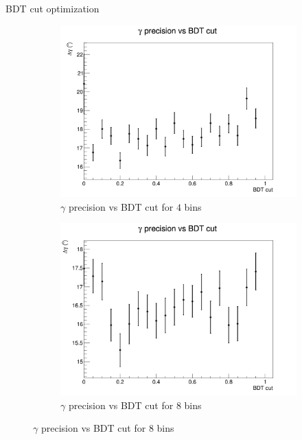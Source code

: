\documentclass{beamer}
\begin{document}
\begin{frame}{BDT cut optimization}
  \begin{figure}
    \centering
    \vspace{-0.2cm}
    \begin{subfigure}{0.5\textwidth}
      \includegraphics[width = 1.0\textwidth]{BDTOptimization_4Bins_Run2.png}
      \caption{$\gamma$ precision vs BDT cut for $4$ bins}
    \end{subfigure}%
    \begin{subfigure}{0.5\textwidth}
      \includegraphics[width = 1.0\textwidth]{BDTOptimization_8Bins_Run2.png}
      \caption{$\gamma$ precision vs BDT cut for $8$ bins}
    \end{subfigure}
  \end{figure}
\end{frame}
\end{document}
